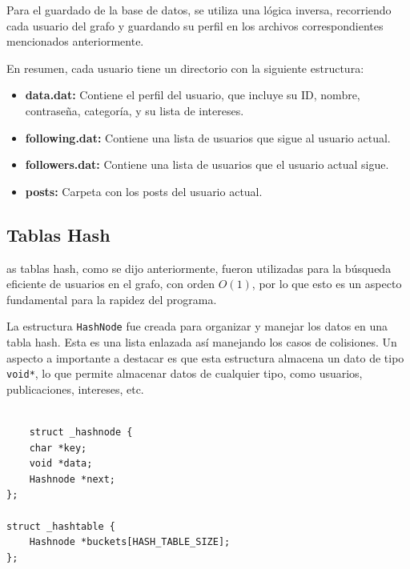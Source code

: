 \documentclass[9pt,letterpaper,onecolumn]{rho-class/rho}
\begin{document}
\vspace{0.5cm}

Para el guardado de la base de datos, se utiliza una lógica inversa, recorriendo cada usuario del grafo y guardando su perfil en los archivos correspondientes mencionados anteriormente.

\vspace{0.5cm}

En resumen, cada usuario tiene un directorio con la siguiente estructura:

\begin{itemize}
	\item \textbf{data.dat:} Contiene el perfil del usuario, que incluye su ID, nombre, contraseña, categoría, y su lista de intereses.
	\item \textbf{following.dat:} Contiene una lista de usuarios que sigue al usuario actual.
	\item \textbf{followers.dat:} Contiene una lista de usuarios que el usuario actual sigue.
	\item \textbf{posts:} Carpeta con los posts del usuario actual.
\end{itemize}
 
\subsection{Tablas Hash}
as tablas hash, como se dijo anteriormente, fueron utilizadas para la búsqueda eficiente de usuarios en el grafo, con orden $O(1)$, por lo que esto es un aspecto fundamental para la rapidez del programa.

\vspace{0.5cm}

La estructura \texttt{HashNode} fue creada para organizar y manejar los datos en una tabla hash. Esta es una lista enlazada así manejando los casos de colisiones. Un aspecto a importante a destacar es que esta estructura almacena un dato de tipo \texttt{void*}, lo que permite almacenar datos de cualquier tipo, como usuarios, publicaciones, intereses, etc.

\begin{lstlisting}[caption={Estructura que representa una celda de una tabla hash}]

	struct _hashnode {
    char *key;
    void *data; 
    Hashnode *next;
};

struct _hashtable {
    Hashnode *buckets[HASH_TABLE_SIZE]; 
};
\end{lstlisting}
\end{document}
